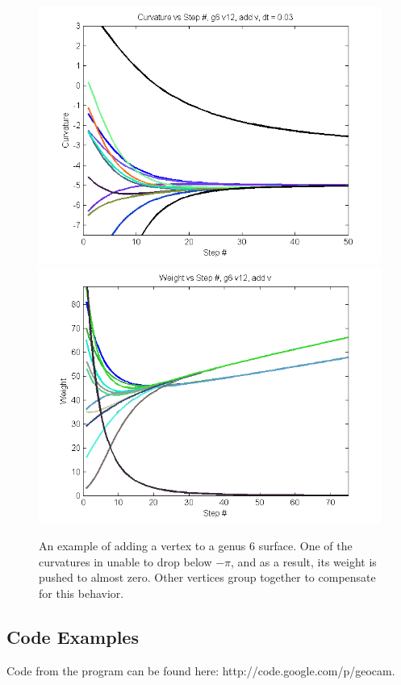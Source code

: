 \documentclass[12pt]{article}
\begin{document}
\begin{figure}
\begin{center}
\includegraphics[scale = 0.7]{Pictures/Curvg6v12addv.png}
\includegraphics[scale = 0.7]{Pictures/Weightg6v12addv.png}
\caption{An example of adding a vertex to a genus 6 surface. One of the curvatures in unable to drop below $-\pi$, and as a result, its weight is pushed to almost zero. Other vertices group together to compensate for this behavior.}
\end{center}
\end{figure}

\subsection{Code Examples}
\noindent Code from the program can be found here: http://code.google.com/p/geocam. \newline
\end{document}
